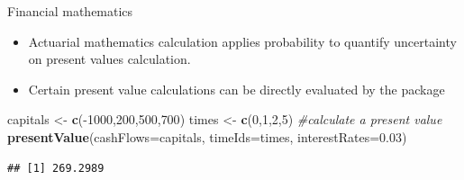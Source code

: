 \documentclass[ignorenonframetext,]{beamer}
\newenvironment{Shaded}{\begin{snugshade}}{\end{snugshade}}
\newcommand{\KeywordTok}[1]{\textcolor[rgb]{0.13,0.29,0.53}{\textbf{{#1}}}}
\newcommand{\DataTypeTok}[1]{\textcolor[rgb]{0.13,0.29,0.53}{{#1}}}
\newcommand{\DecValTok}[1]{\textcolor[rgb]{0.00,0.00,0.81}{{#1}}}
\newcommand{\FloatTok}[1]{\textcolor[rgb]{0.00,0.00,0.81}{{#1}}}
\newcommand{\StringTok}[1]{\textcolor[rgb]{0.31,0.60,0.02}{{#1}}}
\newcommand{\CommentTok}[1]{\textcolor[rgb]{0.56,0.35,0.01}{\textit{{#1}}}}
\newcommand{\NormalTok}[1]{{#1}}
\begin{document}
\begin{frame}[fragile]

\begin{block}{Financial mathematics}

\begin{itemize}[<+->]
\itemsep1pt\parskip0pt
\item
  Actuarial mathematics calculation applies probability to quantify
  uncertainty on present values calculation.
\item
  Certain present value calculations can be directly evaluated by the
  package
\end{itemize}

\begin{Shaded}
\begin{Highlighting}[]
\NormalTok{capitals <-}\StringTok{ }\KeywordTok{c}\NormalTok{(-}\DecValTok{1000}\NormalTok{,}\DecValTok{200}\NormalTok{,}\DecValTok{500}\NormalTok{,}\DecValTok{700}\NormalTok{)}
\NormalTok{times <-}\StringTok{ }\KeywordTok{c}\NormalTok{(}\DecValTok{0}\NormalTok{,}\DecValTok{1}\NormalTok{,}\DecValTok{2}\NormalTok{,}\DecValTok{5}\NormalTok{)}
\CommentTok{#calculate a present value}
\KeywordTok{presentValue}\NormalTok{(}\DataTypeTok{cashFlows=}\NormalTok{capitals, }\DataTypeTok{timeIds=}\NormalTok{times, }
             \DataTypeTok{interestRates=}\FloatTok{0.03}\NormalTok{)}
\end{Highlighting}
\end{Shaded}

\begin{verbatim}
## [1] 269.2989
\end{verbatim}

\end{block}

\end{frame}
\end{document}
